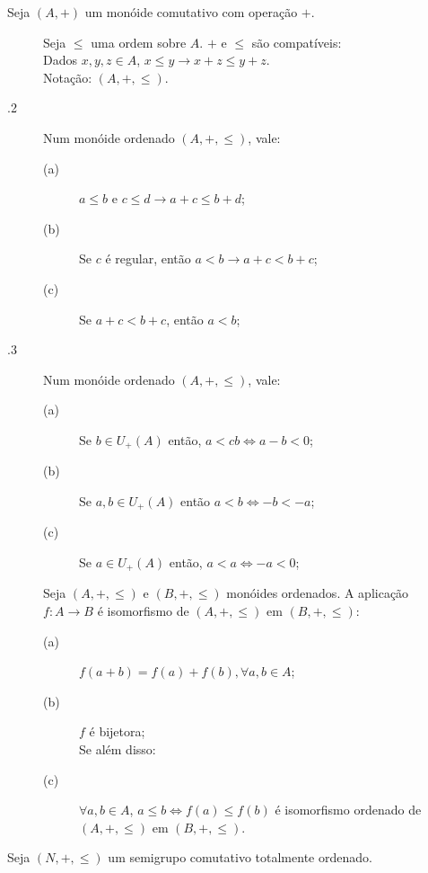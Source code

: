 \documentclass[11pt]{article}
\begin{document}

Seja $(A, +)$ um monóide comutativo com operação $+$.

\begin{description}
  \item[] Seja $\leq$ uma ordem sobre $A$. $+$ e $\leq$ são compatíveis:
    \\
    Dados $x,y,z \in A$, $x \leq y \to x+z \leq y+z$. \\
    Notação: $(A, +, \leq)$.
  \item[.2] Num monóide ordenado $(A, +, \leq)$, vale:
  \begin{description}
    \item[(a)] $a \leq b$ e $c \leq d \to a+c \leq b+d$;
    \item[(b)] Se $c$ é regular, então $a < b \to a+c<b+c$;
    \item[(c)] Se $a+c<b+c$, então $a<b$;
  \end{description}
\item[.3] Num monóide ordenado $(A, +, \leq)$, vale:
  \begin{description}
    \item[(a)] Se $b\in U_+ (A)$ então, $a<cb \iff a-b < 0$;
    \item[(b)] Se $a,b \in U_+ (A)$ então $a<b \iff -b< -a$;
    \item[(c)] Se $a \in U_+ (A)$ então, $a<a \iff -a <0$;
  \end{description}
\item[] Seja $(A, +, \leq)$ e $(B, +, \leq)$ monóides ordenados. A
  aplicação $f: A \to B$ é isomorfismo de $(A, +, \leq)$ em $(B, +, \leq)$:
  \begin{description}
    \item[(a)] $f(a+b) = f(a) + f(b), \forall a,b \in A$;
    \item[(b)] $f$ é bijetora; \\
      Se além disso:
    \item[(c)] $\forall a,b \in A$, $a \leq b \iff f(a) \leq f(b)$ é
      isomorfismo ordenado de $(A, +, \leq)$ em $(B, +, \leq)$.
  \end{description}
\end{description}


Seja $(N, +, \leq)$ um semigrupo comutativo totalmente ordenado.
\end{document}
